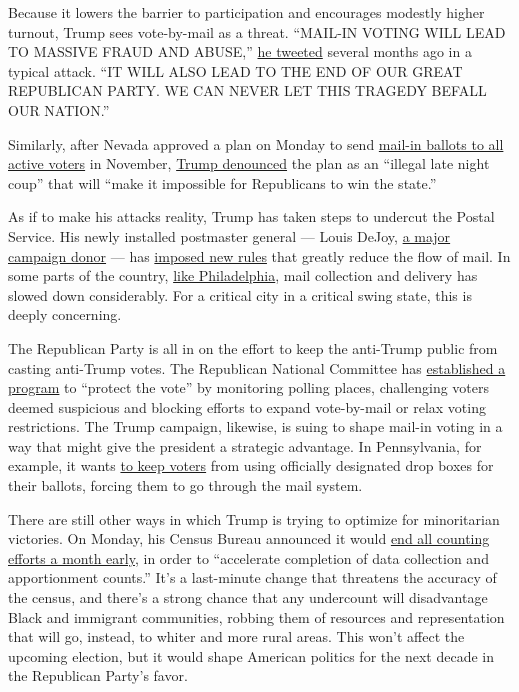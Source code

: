 Because it lowers the barrier to participation and encourages modestly
higher turnout, Trump sees vote-by-mail as a threat. ``MAIL-IN VOTING
WILL LEAD TO MASSIVE FRAUD AND ABUSE,''
\href{https://twitter.com/realdonaldtrump/status/1266172570983940101?s=21}{he
tweeted} several months ago in a typical attack. ``IT WILL ALSO LEAD TO
THE END OF OUR GREAT REPUBLICAN PARTY. WE CAN NEVER LET THIS TRAGEDY
BEFALL OUR NATION.''

Similarly, after Nevada approved a plan on Monday to send
\href{https://www.cnn.com/2020/08/03/politics/nevada-mail-ballots-registered-voters/index.html}{mail-in
ballots to all active voters} in November,
\href{https://twitter.com/realdonaldtrump/status/1290250416278532096?s=21}{Trump
denounced} the plan as an ``illegal late night coup'' that will ``make
it impossible for Republicans to win the state.''

As if to make his attacks reality, Trump has taken steps to undercut the
Postal Service. His newly installed postmaster general --- Louis DeJoy,
\href{https://www.nytimes.com/2020/07/31/us/politics/trump-usps-mail-delays.html}{a
major campaign donor} --- has
\href{https://www.washingtonpost.com/business/2020/07/14/postal-service-trump-dejoy-delay-mail/}{imposed
new rules} that greatly reduce the flow of mail. In some parts of the
country, \href{https://t.co/MPqSHlXP1P}{like Philadelphia}, mail
collection and delivery has slowed down considerably. For a critical
city in a critical swing state, this is deeply concerning.

The Republican Party is all in on the effort to keep the anti-Trump
public from casting anti-Trump votes. The Republican National Committee
has
\href{https://www.nytimes.com/2020/05/18/us/Voting-republicans-trump.html}{established
a program} to ``protect the vote'' by monitoring polling places,
challenging voters deemed suspicious and blocking efforts to expand
vote-by-mail or relax voting restrictions. The Trump campaign, likewise,
is suing to shape mail-in voting in a way that might give the president
a strategic advantage. In Pennsylvania, for example, it wants
\href{https://www.inquirer.com/politics/election/trump-campaign-lawsuit-pennsylvania-mail-ballots-20200629.html}{to
keep voters} from using officially designated drop boxes for their
ballots, forcing them to go through the mail system.

There are still other ways in which Trump is trying to optimize for
minoritarian victories. On Monday, his Census Bureau announced it would
\href{https://www.npr.org/2020/08/03/898548910/census-cut-short-a-month-rushes-to-finish-all-counting-efforts-by-sept-30}{end
all counting efforts a month early}, in order to ``accelerate completion
of data collection and apportionment counts.'' It's a last-minute change
that threatens the accuracy of the census, and there's a strong chance
that any undercount will disadvantage Black and immigrant communities,
robbing them of resources and representation that will go, instead, to
whiter and more rural areas. This won't affect the upcoming election,
but it would shape American politics for the next decade in the
Republican Party's favor.

